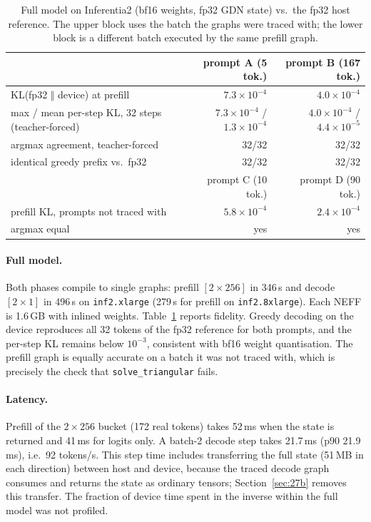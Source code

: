 \documentclass[11pt]{article}
\theoremstyle{remark}
\begin{document}
\begin{table}[t]
\centering\small
\begin{tabular}{lrr}
\toprule
& prompt A (5 tok.) & prompt B (167 tok.) \\
\midrule
KL(fp32 $\Vert$ device) at prefill & $7.3\times10^{-4}$ & $4.0\times10^{-4}$ \\
max / mean per-step KL, 32 steps (teacher-forced) & $7.3\times10^{-4}$ / $1.3\times10^{-4}$ & $4.0\times10^{-4}$ / $4.4\times10^{-5}$ \\
argmax agreement, teacher-forced & 32/32 & 32/32 \\
identical greedy prefix vs.\ fp32 & 32/32 & 32/32 \\
\midrule
& prompt C (10 tok.) & prompt D (90 tok.) \\
\midrule
prefill KL, prompts not traced with & $5.8\times10^{-4}$ & $2.4\times10^{-4}$ \\
argmax equal & yes & yes \\
\bottomrule
\end{tabular}
\caption{Full model on Inferentia2 (bf16 weights, fp32 GDN state) vs.\ the fp32 host reference. The upper block uses the
batch the graphs were traced with; the lower block is a different batch executed by the same prefill graph.}
\label{tab:device}
\end{table}

\paragraph{Full model.} Both phases compile to single graphs: prefill $[2\times256]$ in 346\,s and decode $[2\times1]$ in
496\,s on \texttt{inf2.xlarge} (279\,s for prefill on \texttt{inf2.8xlarge}). Each NEFF is 1.6\,GB with inlined weights.
Table~\ref{tab:device} reports fidelity. Greedy decoding on the device reproduces all 32 tokens of the fp32 reference for both
prompts, and the per-step KL remains below $10^{-3}$, consistent with bf16 weight quantisation. The prefill graph is equally
accurate on a batch it was not traced with, which is precisely the check that \texttt{solve\_triangular} fails.

\paragraph{Latency.} Prefill of the $2\times256$ bucket (172 real tokens) takes 52\,ms when the state is returned and 41\,ms
for logits only. A batch-2 decode step takes 21.7\,ms (p90 21.9\,ms), i.e.\ 92 tokens/s. This step time includes transferring
the full state (51\,MB in each direction) between host and device, because the traced decode graph consumes and returns the
state as ordinary tensors; Section~\ref{sec:27b} removes this transfer. The fraction of device time spent in the inverse
within the full model was not profiled.
\end{document}
